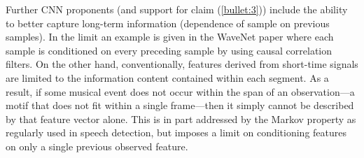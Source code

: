 \documentclass[12pt]{llncs}
\newcommand{\ikN}[1]{\todo[inline, size=\small, color=orange!30]{[ik] #1}}
\begin{document}


Further CNN proponents (and support for claim (\ref{bullet:3})) include the ability to better capture long-term information (dependence of sample on previous samples). In the limit an example is given in the WaveNet paper \cite{van2016wavenet} where each sample is conditioned on every preceding sample by using causal correlation filters. On the other hand, conventionally, features derived from short-time signals are limited to the information content contained within each segment. As a result, if some musical event does not occur within the span of an observation---a motif that does not fit within a single frame---then it simply cannot be described by that feature vector alone. This is in part addressed by the Markov property as regularly used in speech detection, but imposes a limit on conditioning features on only a single previous observed feature.



\end{document}
